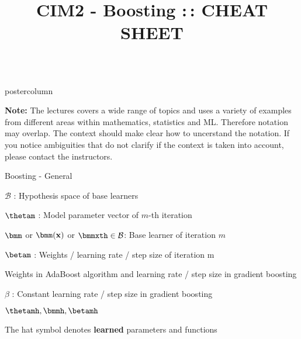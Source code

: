 \documentclass{beamer}
\title{CIM2 - Boosting :\,: CHEAT SHEET} %
\newlength{\columnheight} %
\begin{document}
\begin{frame}[fragile]{}
\begin{columns}
	\begin{column}{.31\textwidth}
		\begin{beamercolorbox}[center]{postercolumn}
			\begin{minipage}{.98\textwidth}
				\parbox[t][\columnheight]{\textwidth}{
					\vspace{1cm}
					\textbf{Note: } The lectures covers a wide range of topics and uses a variety of examples from different areas within mathematics, statistics and ML. Therefore notation may overlap. The context should make clear how to uncerstand the notation. %
					If you notice ambiguities that do not clarify if the context is taken into account, please contact the instructors.
					\begin{myblock}{Boosting - General}
						\begin{codebox}
							$\mathcal{B}$ : Hypothesis space of base learners
						\end{codebox}
						\hspace*{1ex}
						\begin{codebox}
						    $\thetam$ : Model parameter vector of $m$-th iteration
						\end{codebox}
						\hspace*{1ex}
						\begin{codebox}
							 $\bmm$ or $\bmm (\xv)$ or $\bmmxth \in \mathcal{B}$: Base learner of iteration $m$
						\end{codebox}
						\hspace*{1ex}
						\begin{codebox}
						    $\betam$ :  Weights / learning rate / step size of iteration m
						\end{codebox}
						\hspace*{1ex} Weights in AdaBoost algorithm and learning rate / step size in gradient boosting\\
						\begin{codebox}
							$\beta$ : Constant learning rate / step size in gradient boosting
						\end{codebox}
						\hspace*{1ex} 
						\begin{codebox}
						    $\thetamh , \bmmh , \betamh$
						\end{codebox}
						\hspace*{1ex} The hat symbol denotes \textbf{learned} parameters and functions\\
					\end{myblock}
			
}
\end{minipage}
\end{beamercolorbox}
\end{column}
\end{columns}
\end{frame}
\end{document}
